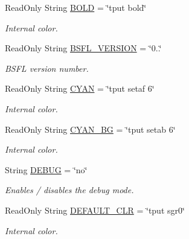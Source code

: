 \begin{DoxyCompactItemize}
\mbox{\label{bsfl_8sh_ab0e55a7835f63838d8aaeee788aa70f0}} 
Read\+Only String \hyperlink{bsfl_8sh_ab0e55a7835f63838d8aaeee788aa70f0}{B\+O\+LD} = \char`\"{}tput bold\char`\"{}
\begin{DoxyCompactList}\small\item\em Internal color. \end{DoxyCompactList}\item 
\mbox{\label{bsfl_8sh_a7daa1b2cceaf03c6698768e1e69fa475}} 
Read\+Only String \hyperlink{bsfl_8sh_a7daa1b2cceaf03c6698768e1e69fa475}{B\+S\+F\+L\+\_\+\+V\+E\+R\+S\+I\+ON} = \char`\"{}0..\char`\"{}
\begin{DoxyCompactList}\small\item\em B\+S\+FL version number. \end{DoxyCompactList}\item 
\mbox{\label{bsfl_8sh_ac96b92766bd1f06e1cde6a2e290462f4}} 
Read\+Only String \hyperlink{bsfl_8sh_ac96b92766bd1f06e1cde6a2e290462f4}{C\+Y\+AN} = \char`\"{}tput setaf 6\char`\"{}
\begin{DoxyCompactList}\small\item\em Internal color. \end{DoxyCompactList}\item 
\mbox{\label{bsfl_8sh_a47fd0be0a875c05337cfaf1b3698d15a}} 
Read\+Only String \hyperlink{bsfl_8sh_a47fd0be0a875c05337cfaf1b3698d15a}{C\+Y\+A\+N\+\_\+\+BG} = \char`\"{}tput setab 6\char`\"{}
\begin{DoxyCompactList}\small\item\em Internal color. \end{DoxyCompactList}\item 
String \hyperlink{bsfl_8sh_a73585d7121de037cf2e2ca12b27eb83e}{D\+E\+B\+UG} = \char`\"{}no\char`\"{}
\begin{DoxyCompactList}\small\item\em Enables / disables the debug mode. \end{DoxyCompactList}\item 
\mbox{\label{bsfl_8sh_ade4c4ad13321805b0081cabc3c446336}} 
Read\+Only String \hyperlink{bsfl_8sh_ade4c4ad13321805b0081cabc3c446336}{D\+E\+F\+A\+U\+L\+T\+\_\+\+C\+LR} = \char`\"{}tput sgr0\char`\"{}
\begin{DoxyCompactList}\small\item\em Internal color. \end{DoxyCompactList}\item 

\end{DoxyCompactItemize}
